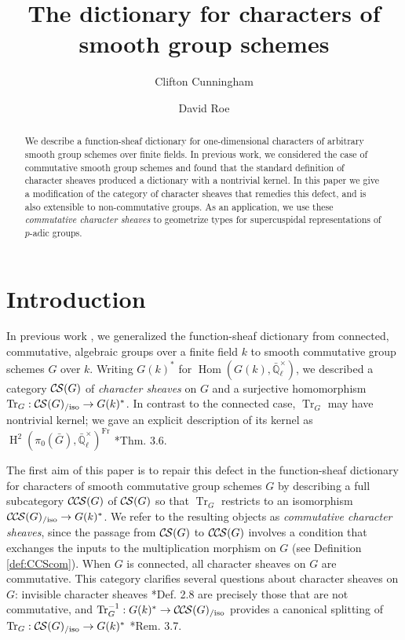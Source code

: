 \documentclass[10pt]{amsart}
\title[Commutative Character Sheaves]{The dictionary for characters of smooth group schemes}
\author{Clifton Cunningham}
\author{David Roe}
\theoremstyle{plain}
\theoremstyle{definition}
\newcommand{\EE}{\mathbb{\bar Q}_\ell}
\newcommand{\EEx}{\EE^\times}
\newcommand{\Frob}[1]{\operatorname{Fr}_{#1}}
\DeclareMathOperator{\Hom}{Hom}
\DeclareMathOperator{\Hh}{H}
\newcommand{\TrFrob}[1]{\operatorname{Tr}_{#1}}
\newcommand{\CS}{{\mathcal{C\hskip-0.8pt S}}}
\newcommand{\CCS}{{\mathcal{C\hskip-.8pt C\hskip-0.8pt S}}}
\newcommand{\CSiso}[1]{\CS(#1)_{/\text{iso}}}
\newcommand{\CCSiso}[1]{\CCS(#1)_{/\text{iso}}}
\newcommand{\bG}{\bar{G}}
\begin{document}
\begin{abstract}
We describe a function-sheaf dictionary for one-dimensional characters of arbitrary smooth group schemes over finite fields.  
In previous work, we considered the case of commutative smooth group schemes and found that the standard definition of character sheaves produced a dictionary with a nontrivial kernel.  
In this paper we give a modification of the category of character sheaves that remedies this defect, and is also extensible to non-commutative groups.  
As an application, we use these \emph{commutative character sheaves} to geometrize types for supercuspidal representations of $p$-adic groups.
\end{abstract}

\maketitle

\tableofcontents

\section*{Introduction}

In previous work \cite{cunningham-roe:13a}, we generalized the function-sheaf dictionary from connected, commutative, algebraic groups over a finite field $k$ to smooth commutative group schemes $G$ over $k$.  
Writing $G(k)^*$ for $\Hom(G(k), \EEx)$, we described a category $\CS(G)$ of \emph{character sheaves} on $G$ and a surjective homomorphism $\TrFrob{G} : \CSiso{G} \to G(k)^*$.
In contrast to the connected case, $\TrFrob{G}$ may have nontrivial kernel; we gave an explicit description of its kernel as $\Hh^2(\pi_0(\bG), \EEx)^{\Frob{}}$ \cite{cunningham-roe:13a}*{Thm. 3.6}.  

The first aim of this paper is to repair this defect in the function-sheaf dictionary for characters of smooth commutative group schemes $G$ by describing a full subcategory $\CCS(G)$ of $\CS(G)$ so that $\TrFrob{G}$ restricts to an isomorphism $\CCSiso{G} \to G(k)^*$.
We refer to the resulting objects as \emph{commutative character sheaves}, since the passage from $\CS(G)$ to $\CCS(G)$ involves a condition that exchanges the inputs to the multiplication morphism on $G$ (see Definition \ref{def:CCScom}).  
When $G$ is connected, all character sheaves on $G$ are commutative.
This category clarifies several questions about character sheaves on $G$: invisible character sheaves \cite{cunningham-roe:13a}*{Def. 2.8} are precisely those that are not commutative, and $\TrFrob{G}^{-1} : G(k)^* \to \CCSiso{G}$ provides a canonical splitting of $\TrFrob{G} : \CSiso{G} \to G(k)^*$ \cite{cunningham-roe:13a}*{Rem. 3.7}.
\end{document}
